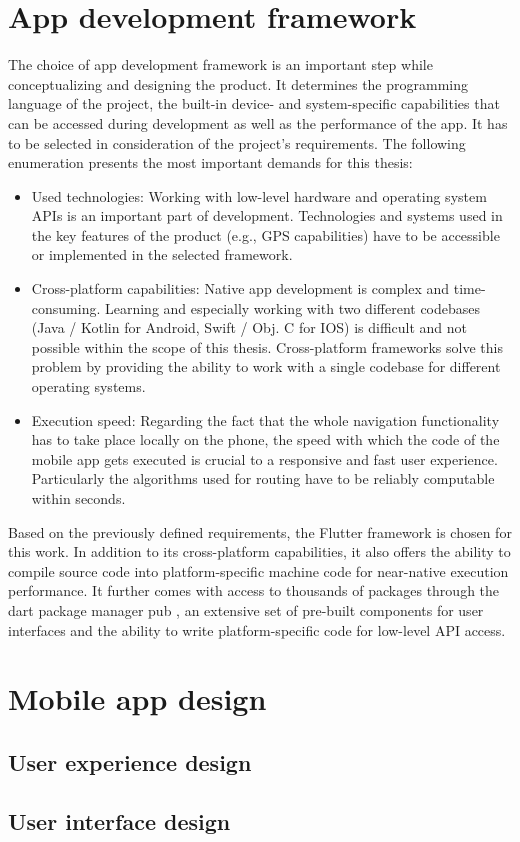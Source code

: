 \section{App development framework}
The choice of app development framework is an important step while conceptualizing and designing the product. It determines the programming language of the project, the built-in device- and system-specific capabilities that can be accessed during development as well as the performance of the app. It has to be selected in consideration of the project's requirements. The following enumeration presents the most important demands for this thesis:
\begin{itemize}
    \item Used technologies: Working with low-level hardware and operating system APIs is an important part of development. Technologies and systems used in the key features of the product (e.g., GPS capabilities) have to be accessible or implemented in the selected framework.
    \item Cross-platform capabilities: Native app development is complex and time-consuming. Learning and especially working with two different codebases (Java / Kotlin for Android, Swift / Obj. C for IOS) is difficult and not possible within the scope of this thesis. Cross-platform frameworks solve this problem by providing the ability to work with a single codebase for different operating systems.
    \item Execution speed: Regarding the fact that the whole navigation functionality has to take place locally on the phone, the speed with which the code of the mobile app gets executed is crucial to a responsive and fast user experience. Particularly the algorithms used for routing have to be reliably computable within seconds.
\end{itemize}

Based on the previously defined requirements, the Flutter framework \cite{flutter} is chosen for this work. In addition to its cross-platform capabilities, it also offers the ability to compile source code into platform-specific machine code for near-native execution performance. It further comes with access to thousands of packages through the dart package manager pub \cite{pub_dev}, an extensive set of pre-built components for user interfaces and the ability to write platform-specific code for low-level API access.

\section{Mobile app design}
\subsection{User experience design}
\subsection{User interface design}
